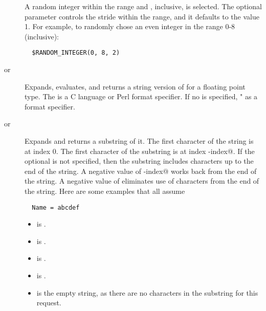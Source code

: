 \begin{description}
\item []
A random integer within the range \verb@min@ and \verb@max@, inclusive,
is selected.
The optional \verb@step@ parameter
controls the stride within the range, and it defaults to the value 1.
For example, to randomly chose an even integer in the range 0-8 (inclusive):
\begin{verbatim}
  $RANDOM_INTEGER(0, 8, 2)
\end{verbatim}

\item [
       or ]
Expands, evaluates, and returns a string version of 
 for a floating point type.
The  is a C language or Perl format specifier.
If no  is specified, \verb@"%16G"@ is used
as a format specifier.

\item [
       or ]
Expands \verb@name@ and returns a substring of it.
The first character of the string is at index 0.
The first character of the substring is at index \verb@start-index@.
If the optional \verb@length@ is not specified, 
then the substring includes characters up to the end of the string.
A negative value of  \verb@start-index@ works back from the end of the
string.
A negative value of \verb@length@ eliminates use of characters
from the end of the string.
Here are some examples that all assume
\begin{verbatim}
  Name = abcdef
\end{verbatim}
\begin{itemize}
  \item {} is .
  \item {} is .
  \item {} is .
  \item {} is .
  \item {} is the empty string, as there are
no characters in the substring for this request.
\end{itemize}

\end{description}
